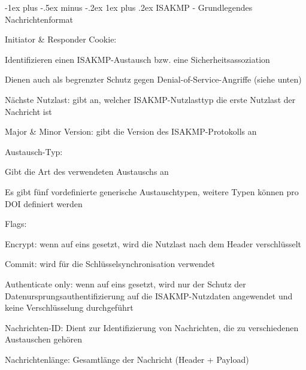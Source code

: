 \documentclass[a4paper]{article}
\makeatletter
\renewcommand{\subsubsection}{\@startsection{subsubsection}{3}{0mm}%
 {-1ex plus -.5ex minus -.2ex}%
 {1ex plus .2ex}%
 {\normalfont\small\bfseries}}
\makeatother
\begin{document}
\begin{multicols}{3}
      \subsubsection{ISAKMP - Grundlegendes Nachrichtenformat}
      \begin{itemize*}
            \item %
            \item Initiator \& Responder Cookie:
            \begin{itemize*}
                  \item Identifizieren einen ISAKMP-Austausch bzw. eine Sicherheitsassoziation
                  \item Dienen auch als begrenzter Schutz gegen Denial-of-Service-Angriffe (siehe unten)
            \end{itemize*}
            \item Nächste Nutzlast: gibt an, welcher ISAKMP-Nutzlasttyp die erste Nutzlast der Nachricht ist
            \item Major \& Minor Version: gibt die Version des ISAKMP-Protokolls an
            \item Austausch-Typ:
            \begin{itemize*}
                  \item Gibt die Art des verwendeten Austauschs an
                  \item Es gibt fünf vordefinierte generische Austauschtypen, weitere Typen können pro DOI definiert werden
            \end{itemize*}
            \item Flags:
            \begin{itemize*}
                  \item Encrypt: wenn auf eins gesetzt, wird die Nutzlast nach dem Header verschlüsselt
                  \item Commit: wird für die Schlüsselsynchronisation verwendet
                  \item Authenticate only: wenn auf eins gesetzt, wird nur der Schutz der Datenursprungsauthentifizierung auf die ISAKMP-Nutzdaten angewendet und keine Verschlüsselung durchgeführt
            \end{itemize*}
            \item Nachrichten-ID: Dient zur Identifizierung von Nachrichten, die zu verschiedenen Austauschen gehören
            \item Nachrichtenlänge: Gesamtlänge der Nachricht (Header + Payload)

\end{itemize*}
\end{multicols}
\end{document}
